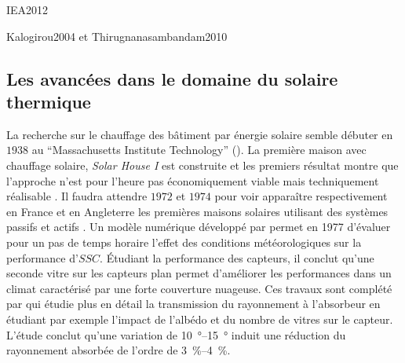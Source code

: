 IEA2012

Kalogirou2004 et Thirugnanasambandam2010




\subsection{Les avancées dans le domaine du solaire thermique} %
\label{sub:les_avancées_dans_le_domaine_du_solaire_thermique}


La recherche sur le chauffage des bâtiment par énergie solaire
semble débuter en $1938$ au \enquote{Massachusetts Institute Technology} ().
La première maison avec chauffage solaire, \textit{Solar House I} est construite et les premiers résultat
montre que l’approche n’est pour l’heure pas économiquement viable mais techniquement réalisable
. Il faudra attendre $1972$ et $1974$ pour voir apparaître respectivement
en France et en Angleterre les premières maisons solaires utilisant des systèmes
passifs et actifs . Un modèle numérique développé
par \textcite{Hunn197733} permet en 1977 d’évaluer pour un pas de temps horaire l’effet
des conditions météorologiques sur la performance d’$SSC$. Étudiant la performance
des capteurs, il conclut qu’une seconde vitre sur les capteurs plan permet d’améliorer
les performances dans un climat caractérisé par une forte couverture nuageuse.
Ces travaux sont complété par \textcite{Elsayed1989} qui étudie plus en détail la
transmission du rayonnement à l’absorbeur en étudiant par exemple
l’impact de l’albédo et du nombre de vitres sur le capteur. L’étude conclut qu’une
variation de \SIrange{10}{15}{\degree} induit une réduction du rayonnement absorbée
de l’ordre de \SIrange{3}{4}{\percent}.


